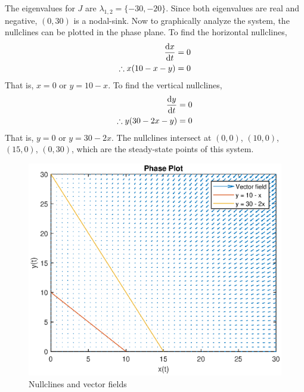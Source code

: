 \documentclass[12pt,1in]{article}
\newenvironment{Example}[2][Example]{\begin{trivlist}
		\item[\hskip \labelsep {\bfseries #1}\hskip \labelsep {\bfseries #2.}]}{\end{trivlist}}
\begin{document}
\begin{Example}{1}
The eigenvalues for $J$ are $\lambda_{1,2} = \{-30, -20\}$. Since both eigenvalues are real and negative, $(0,30)$ is a nodal-sink. 
Now to graphically analyze the system, the nullclines can be plotted in the phase plane.
To find the horizontal nullclines,
\begin{align*}
\derivative{x}{t} &= 0\\
\therefore x(10 - x -y) &= 0
\end{align*}
That is, $x = 0$ or $y = 10 - x$. 
To find the vertical nullclines,
\begin{align*}
\derivative{y}{t} &= 0\\
\therefore y(30 - 2x - y) &= 0
\end{align*}
That is, $y = 0$ or $y = 30 - 2x$. 
The nullclines intersect at $(0,0)$, $(10,0)$, $(15,0)$, $(0,30)$, which are the steady-state points of this system. 
\begin{figure}[H]
	\centering
	\includegraphics[width=1\linewidth]{Figures/example_1}
	\caption{Nullclines and vector fields}
	\label{fig:example1}
\end{figure}

\end{Example}
\end{document}
